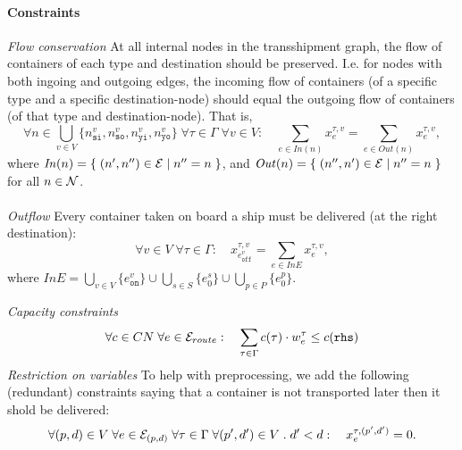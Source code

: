 \paragraph{Constraints}$\;$\\
\textit{Flow conservation} 
At all internal nodes in the transshipment graph, the flow of containers of each type and destination should be preserved. I.e. for nodes with both ingoing and outgoing edges,  the incoming flow of containers (of a specific type and a specific destination-node) should equal the outgoing flow of containers (of that type and destination-node). That is, 
\[
\forall {n}\in \bigcup_{v\in V}\{n^v_{\texttt{si}}, n^v_\texttt{so}, n^v_\texttt{yi}, n^v_\texttt{yo}\}\; \forall \tau \in \Gamma\; \forall v \in V: 
\quad \sum_{e\in \mathit{In}(n)}x^{\tau, v}_e = \sum_{e\in \mathit{Out}(n)}x^{\tau, v}_e,
\]
where $\mathit{In}(n) = \{\;{(n',n'')\in\mathcal{E}}\;|\;{n'' = n}\;\}$, and $\mathit{Out}(n) = \{\;{(n'',n')\in \mathcal{E}}\;|\;{n'' = n}\;\}$ for all ${n}\in \mathcal{N}$.
\\\\
\textit{Outflow}
%
Every container taken on board a ship must be delivered (at the right destination):
\[
\forall v\in V\;\forall\tau\in\Gamma:\quad
x^{\tau,v}_{e^{v}_{\texttt{off}}} = \sum_{e\in \mathit{InE}}x^{\tau,v}_e,
\]
where $\mathit{InE} = \bigcup_{v\in V}\{e^v_{\texttt{on}}\}\cup\bigcup_{s\in S}\{e^s_{0}\}\cup\bigcup_{p\in P}\{e^p_{0}\}$. 

\textit{Capacity constraints}
\[
\forall c\in CN\;\forall e\in \mathcal{E}_{route}:\quad
        \sum_{\tau \in \Gamma} c(\tau)\cdot w^\tau_e \leq c(\texttt{rhs})
\]
\textit{Restriction on variables}
To help with preprocessing, we add the following (redundant) constraints saying that a container is not transported later then it shold be delivered:
\[
\forall (p,d) \in V\; \forall e\in\mathcal{E}_{(p,d)}\;\forall \tau\in\Gamma\;\forall(p',d')\in V\;.\; d'< d :\quad x^{\tau, (p',d')}_{e} = 0.
\]

